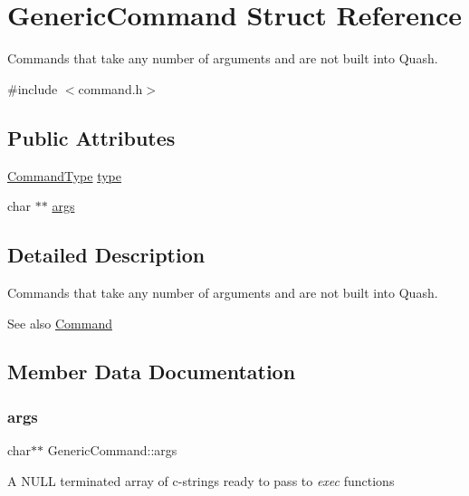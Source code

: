 \hypertarget{structGenericCommand}{}\section{Generic\+Command Struct Reference}
\label{structGenericCommand}


Commands that take any number of arguments and are not built into Quash.  




{\ttfamily \#include $<$command.\+h$>$}

\subsection*{Public Attributes}
\begin{DoxyCompactItemize}
\item 
\hyperlink{command_8h_a21e038f5b8958e203d28bc4f18472352}{Command\+Type} \hyperlink{structGenericCommand_af50a1b4b5724e01b97f4755627de108e}{type}
\item 
char $\ast$$\ast$ \hyperlink{structGenericCommand_a0f2219278396d334144d424c02fd6389}{args}
\end{DoxyCompactItemize}


\subsection{Detailed Description}
Commands that take any number of arguments and are not built into Quash. 

\begin{DoxySeeAlso}{See also}
\hyperlink{unionCommand}{Command} 
\end{DoxySeeAlso}


\subsection{Member Data Documentation}
\mbox{\label{structGenericCommand_a0f2219278396d334144d424c02fd6389}} 
\subsubsection{\texorpdfstring{args}{args}}
{\footnotesize\ttfamily char$\ast$$\ast$ Generic\+Command\+::args}

A N\+U\+LL terminated array of c-\/strings ready to pass to {\itshape exec} functions \mbox{\label{structGenericCommand_af50a1b4b5724e01b97f4755627de108e}} 
